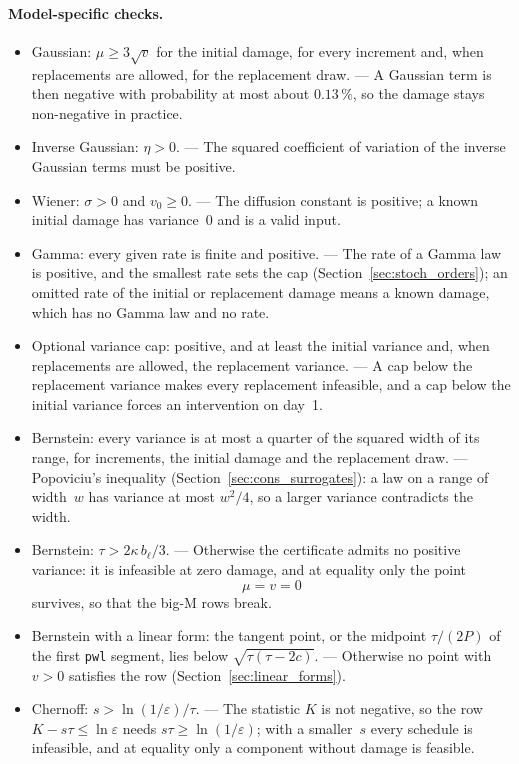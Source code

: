 \documentclass[11pt,a4paper]{article}
\theoremstyle{plain}
\theoremstyle{definition}
\theoremstyle{remark}
\begin{document}
\paragraph{Model-specific checks.}
\begin{itemize}
  \item Gaussian: $\mu \ge 3\sqrt{v}$ for the initial damage, for every increment and, when replacements are allowed, for the replacement draw. --- A Gaussian term is then negative with probability at most about $0.13\,\%$, so the damage stays non-negative in practice.
  \item Inverse Gaussian: $\eta > 0$. --- The squared coefficient of variation of the inverse Gaussian terms must be positive.
  \item Wiener: $\sigma > 0$ and $v_0 \ge 0$. --- The diffusion constant is positive; a known initial damage has variance~$0$ and is a valid input.
  \item Gamma: every given rate is finite and positive. --- The rate of a Gamma law is positive, and the smallest rate sets the cap (Section~\ref{sec:stoch_orders}); an omitted rate of the initial or replacement damage means a known damage, which has no Gamma law and no rate.
  \item Optional variance cap: positive, and at least the initial variance and, when replacements are allowed, the replacement variance. --- A cap below the replacement variance makes every replacement infeasible, and a cap below the initial variance forces an intervention on day~1.
  \item Bernstein: every variance is at most a quarter of the squared width of its range, for increments, the initial damage and the replacement draw. --- Popoviciu's inequality (Section~\ref{sec:cons_surrogates}): a law on a range of width~$w$ has variance at most $w^2/4$, so a larger variance contradicts the width.
  \item Bernstein: $\tau > 2\kappa\, b_\ell/3$. --- Otherwise the certificate admits no positive variance: it is infeasible at zero damage, and at equality only the point
    \begin{equation}
      \mu = v = 0
    \end{equation}
    survives, so that the big-M rows break.
  \item Bernstein with a linear form: the tangent point, or the midpoint $\tau/(2P)$ of the first \texttt{pwl} segment, lies below $\sqrt{\tau(\tau - 2c)}$. --- Otherwise no point with $v > 0$ satisfies the row (Section~\ref{sec:linear_forms}).
  \item Chernoff: $s > \ln(1/\varepsilon)/\tau$. --- The statistic $K$ is not negative, so the row $K - s\tau \le \ln\varepsilon$ needs $s\tau \ge \ln(1/\varepsilon)$; with a smaller~$s$ every schedule is infeasible, and at equality only a component without damage is feasible.

\end{itemize}
\end{document}
